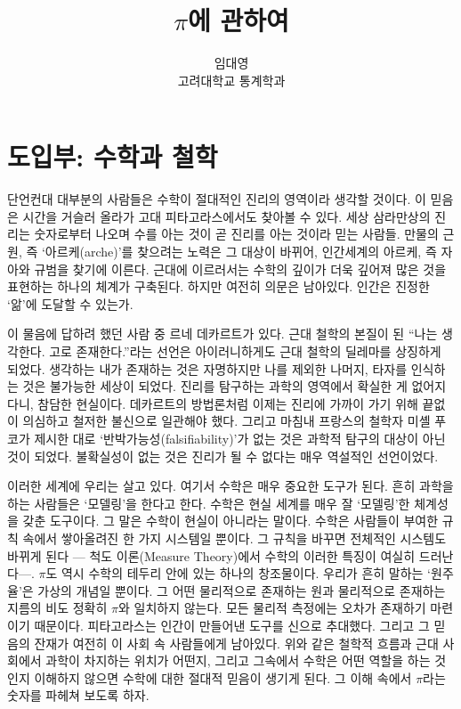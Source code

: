 \documentclass[10pt]{article}
\begin{document}
\nocite{*}

\title{$\pi$에 관하여}
\author{임대영 \\ 고려대학교 통계학과}
\maketitle

\section{도입부: 수학과 철학}
단언컨대 대부분의 사람들은 수학이 절대적인 진리의 영역이라 생각할 것이다. 이 믿음은 시간을 거슬러 올라가 고대 피타고라스에서도 찾아볼 수 있다. 세상 삼라만상의 진리는 숫자로부터 나오며 수를 아는 것이 곧 진리를 아는 것이라 믿는 사람들. 만물의 근원, 즉 `아르케(arche)'를 찾으려는 노력은 그 대상이 바뀌어, 인간세계의 아르케, 즉 자아와 규범을 찾기에 이른다. 근대에 이르러서는 수학의 깊이가 더욱 깊어져 많은 것을 표현하는 하나의 체계가 구축된다. 하지만 여전히 의문은 남아있다. 인간은 진정한 `앎'에 도달할 수 있는가.\par
이 물음에 답하려 했던 사람 중 르네 데카르트가 있다. 근대 철학의 본질이 된 ``나는 생각한다. 고로 존재한다.''라는 선언은 아이러니하게도 근대 철학의 딜레마를 상징하게 되었다. 생각하는 내가 존재하는 것은 자명하지만 나를 제외한 나머지, 타자를 인식하는 것은 불가능한 세상이 되었다. 진리를 탐구하는 과학의 영역에서 확실한 게 없어지다니, 참담한 현실이다. 데카르트의 방법론처럼 이제는 진리에 가까이 가기 위해 끝없이 의심하고 철저한 불신으로 일관해야 했다. 그리고 마침내 프랑스의 철학자 미셸 푸코가 제시한 대로 `반박가능성(falsifiability)'가 없는 것은 과학적 탐구의 대상이 아닌 것이 되었다. 불확실성이 없는 것은 진리가 될 수 없다는 매우 역설적인 선언이었다. \par
이러한 세계에 우리는 살고 있다. 여기서 수학은 매우 중요한 도구가 된다. 흔히 과학을 하는 사람들은 `모델링'을 한다고 한다. 수학은 현실 세계를 매우 잘 `모델링'한 체계성을 갖춘 도구이다. 그 말은 수학이 현실이 아니라는 말이다. 수학은 사람들이 부여한 규칙 속에서 쌓아올려진 한 가지 시스템일 뿐이다. 그 규칙을 바꾸면 전체적인 시스템도 바뀌게 된다 --- 척도 이론(Measure Theory)에서 수학의 이러한 특징이 여실히 드러난다---. $\pi$도 역시 수학의 테두리 안에 있는 하나의 창조물이다. 우리가 흔히 말하는 `원주율'은 가상의 개념일 뿐이다. 그 어떤 물리적으로 존재하는 원과 물리적으로 존재하는 지름의 비도 정확히 $\pi$와 일치하지 않는다. 모든 물리적 측정에는 오차가 존재하기 마련이기 때문이다. 피타고라스는 인간이 만들어낸 도구를 신으로 추대했다. 그리고 그 믿음의 잔재가 여전히 이 사회 속 사람들에게 남아있다. 위와 같은 철학적 흐름과 근대 사회에서 과학이 차지하는 위치가 어떤지, 그리고 그속에서 수학은 어떤 역할을 하는 것인지 이해하지 않으면 수학에 대한 절대적 믿음이 생기게 된다. 그 이해 속에서 $\pi$라는 숫자를 파헤쳐 보도록 하자.
\end{document}
